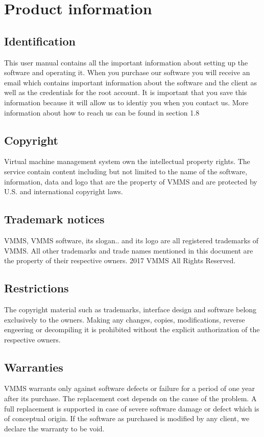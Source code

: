 \chapter{Product information}
\vspace{-6em}


\section{Identification}
This user manual contains all the important information about setting up the
software and operating it. When you purchase our software you will receive an
email which contains important information about the software and the client as
well as the credentials for the root account. It is important that you save this
information because it will allow us to identiy you when you contact us. More 
information about how to reach us can be found in section 1.8

\section{Copyright}

Virtual machine management system own the intellectual property rights. The
service contain content including  but not limited to the name of the software,
information, data and logo that are the property of VMMS and are protected by
U.S. and international copyright laws.

\section{Trademark notices}

VMMS, VMMS software, its slogan.. and its logo are all registered trademarks of
VMMS. All other trademarks and trade names mentioned in this document are the
property of their respective owners. 2017 VMMS All Rights Reserved.

\section{Restrictions}
The copyright material such as trademarks, interface design and software belong
exclusively to the owners. Making any changes, copies, modifications, reverse
engeering or decompiling it is prohibited without the explicit authorization of 
the respective owners.

\section{Warranties}
VMMS warrants only against software defects or failure for a period of one year
after its purchase. The replacement cost depends on the cause of the problem. A
full replacement is supported in case of severe software damage or defect which
is of conceptual origin. If the software as purchased is modified by any client,
we declare the warranty to be void.

